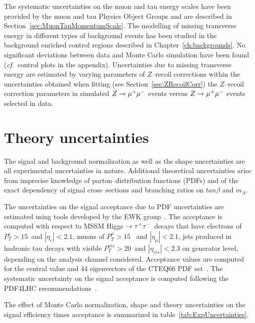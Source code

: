 The systematic uncertainties on the muon and tau energy scales have been
provided by the muon and tau Physics Object Groups and are described in
Section~\ref{sec:MuonTauMomentumScale}.
The modelling of missing transverse energy in different types of background
events has been studied in the background enriched control regions described in
Chapter~\ref{ch:backgrounds}.  No significant deviations between data and Monte
Carlo simulation have been found ({\it cf.}\ control plots in the appendix).
Uncertainties due to missing transverse energy are estimated by varying
parameters of $Z$--recoil corrections within the uncertainties obtained when
fitting (see Section~\ref{sec:ZRecoilCorr}) the $Z$--recoil correction
parameters in simulated $Z \to \mu^+\mu^-$ events versus $Z \to \mu^+\mu^-$ events selected in
data.


\section{Theory uncertainties}

The signal and background normalization as well as the shape uncertainties are
all experimental uncertainties in nature.  Additional theoretical uncertainties
arise from imprecise knowledge of parton--distribution functions (PDFs) and of
the exact dependency of signal cross--sections and branching ratios on
$tan\beta$ and $m_A$.

The uncertainties on the signal acceptance due to PDF uncertainties are
estimated using tools developed by the EWK
group~\cite{CMS_EWK_pdfUncertaintyTools}.  The acceptance is computed with
respect to MSSM Higgs $\to \tau^+\tau^-$ decays that have electrons of $P_{T}^{e} >
15$~\GeV and $\left| \eta_{e} \right| < 2.1$, muons of $P_{T}^{\mu} > 15$~\GeV
and $\left| \eta_{\mu} \right| < 2.1$, jets produced in hadronic tau decays with
visible $P_{T}^{vis} > 20$~\GeV and $\left| \eta_{vis} \right| < 2.3$ on
generator level, depending on the analysis channel considered.  Acceptance
values are computed for the central value and $44$ eigenvectors of the CTEQ66
PDF set~\cite{CTEQpdfSet}.  The systematic uncertainty on the signal acceptance
is computed following the PDF4LHC
recommendations~\cite{pdfAccSys01,pdfAccSys02}.


The effect of Monte Carlo normalization, shape and theory uncertainties on the
signal efficiency times acceptance is summarized in
table~\ref{tab:ExpUncertainties}.

